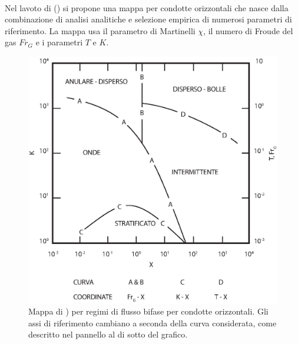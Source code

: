 \paragraph{\textcite{taitel1976model}}
Nel lavoto di \textcite{taitel1976model} () si propone una mappa per condotte orizzontali che nasce dalla combinazione di analisi analitiche e selezione empirica di numerosi parametri di riferimento. La mappa usa il parametro di Martinelli \(\chi\), il numero di Froude del gas \(Fr_G\) e i parametri \(T\) e \(K\).

\begin{figure}[htbp]
    \centering
    \includegraphics[width=.6\textwidth]{fig/fluidodinamica/taitel.eps}
    \caption{Mappa di \textcite{taitel1976model}) per regimi di flusso bifase per condotte orizzontali. Gli assi di riferimento cambiano a seconda della curva considerata, come descritto nel pannello al di sotto del grafico.}
    \label{fig:taitel}
\end{figure}

